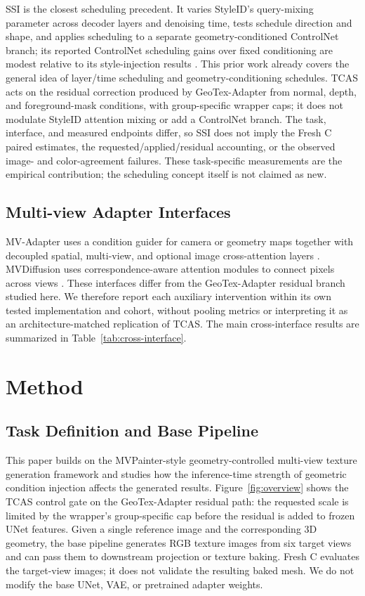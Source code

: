 \documentclass[times,twocolumn,final]{elsarticle}
\begin{document}
SSI is the closest scheduling precedent. It varies StyleID's query-mixing parameter across decoder layers and denoising time, tests schedule direction and shape, and applies scheduling to a separate geometry-conditioned ControlNet branch; its reported ControlNet scheduling gains over fixed conditioning are modest relative to its style-injection results \cite{kulkarni2026ssi}. This prior work already covers the general idea of layer/time scheduling and geometry-conditioning schedules. TCAS acts on the residual correction produced by GeoTex-Adapter from normal, depth, and foreground-mask conditions, with group-specific wrapper caps; it does not modulate StyleID attention mixing or add a ControlNet branch. The task, interface, and measured endpoints differ, so SSI does not imply the Fresh C paired estimates, the requested/applied/residual accounting, or the observed image- and color-agreement failures. These task-specific measurements are the empirical contribution; the scheduling concept itself is not claimed as new.

\subsection{Multi-view Adapter Interfaces}
\label{subsec:mvinterfaces}

MV-Adapter uses a condition guider for camera or geometry maps together with decoupled spatial, multi-view, and optional image cross-attention layers \cite{huang2024mvadapter}. MVDiffusion uses correspondence-aware attention modules to connect pixels across views \cite{tang2023mvdiffusion}. These interfaces differ from the GeoTex-Adapter residual branch studied here. We therefore report each auxiliary intervention within its own tested implementation and cohort, without pooling metrics or interpreting it as an architecture-matched replication of TCAS. The main cross-interface results are summarized in Table~\ref{tab:cross-interface}.

\section{Method}
\label{sec:method}

\subsection{Task Definition and Base Pipeline}
\label{subsec:task}

This paper builds on the MVPainter-style geometry-controlled multi-view texture generation framework \cite{shao2025mvpainter} and studies how the inference-time strength of geometric condition injection affects the generated results. Figure~\ref{fig:overview} shows the TCAS control gate on the GeoTex-Adapter residual path: the requested scale is limited by the wrapper's group-specific cap before the residual is added to frozen UNet features. Given a single reference image and the corresponding 3D geometry, the base pipeline generates RGB texture images from six target views and can pass them to downstream projection or texture baking. Fresh C evaluates the target-view images; it does not validate the resulting baked mesh. We do not modify the base UNet, VAE, or pretrained adapter weights.
\end{document}
